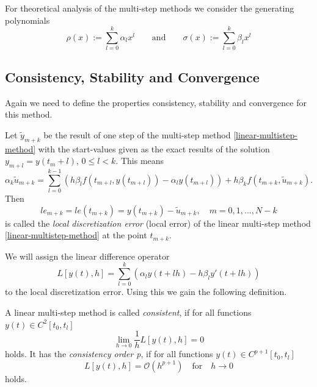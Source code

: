 	For theoretical analysis of the multi-step methods we consider the generating polynomials
	\begin{equation}
		\label{eq:generating polynomials multistep method}
		\rho(x) := \sum_{l=0}^{k} \alpha_l x^l
		\qquad \text{and} \qquad
		\sigma(x) := \sum_{l=0}^{k} \beta_l x^l
	\end{equation}
			
	
	\subsection{Consistency, Stability and Convergence}
	\cite{NumerikGewöhnlicherDifferentialgleichungen}
	
	Again we need to define the properties consistency, stability and convergence for this method.
	\begin{definition}
		Let $\tilde{y}_{m+k}$ be the result of one step of the multi-step method \ref{linear-multistep-method} with the start-values given as the exact results of the solution $y_{m+l} = y(t_m+l)$, $0 \leq l < k$. This means
		\begin{displaymath}
			\alpha_k \tilde{u}_{m+k} = \sum_{l=0}^{k-1} \left( h \beta_l f(t_{m+l}, y(t_{m+l})) - \alpha_l y(t_{m+l}) \right) + h \beta_k f(t_{m+k}, \tilde{u}_{m+k}) .
		\end{displaymath}
		Then
		\begin{displaymath}
			le_{m+k} = le(t_{m+k}) = y(t_{m+k}) - \tilde{u}_{m+k}, \quad m=0,1,...,N-k
		\end{displaymath}
		is called the \emph{local discretization error} (local error) of the linear multi-step method \ref{linear-multistep-method} at the point $t_{m+k}$.
	\end{definition}
	
	We will assign the linear difference operator
	\begin{equation}
		L[y(t),h] = \sum_{l=0}^{k} \left( \alpha_l y(t+lh) - h \beta_l y'(t+lh) \right)
	\end{equation}
	to the local discretization error. Using this we gain the following definition.

	\begin{definition}
		A linear multi-step method is called %
		\emph{consistent}, if for all functions $y(t) \in C^2[t_0,t_l]$
		\begin{displaymath}
			\lim\limits_{h \to 0} \frac{1}{h} L[y(t),h] = 0
		\end{displaymath}
		holds. It has the \emph{consistency order p}, if for all functions $y(t) \in C^{p+1}[t_0, t_l]$
		\begin{displaymath}
			L[y(t),h] = \mathcal{O}(h^{p+1}) \quad \text{for} \quad h \to 0
		\end{displaymath}
		holds.
	\end{definition}

